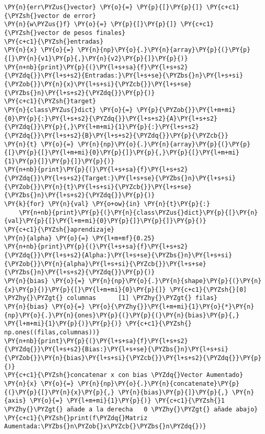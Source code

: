 \begin{tcolorbox}[breakable, size=fbox, boxrule=1pt, pad at break*=1mm,colback=cellbackground, colframe=cellborder]
\begin{Verbatim}[commandchars=\\\{\}]
\PY{n}{err\PYZus{}vector} \PY{o}{=} \PY{p}{[}\PY{p}{]} \PY{c+c1}{\PYZsh{}vector de error}
\PY{n}{w\PYZus{}f} \PY{o}{=} \PY{p}{[}\PY{p}{]} \PY{c+c1}{\PYZsh{}vector de pesos finales}
\PY{c+c1}{\PYZsh{}entradas}
\PY{n}{x} \PY{o}{=} \PY{n}{np}\PY{o}{.}\PY{n}{array}\PY{p}{(}\PY{p}{[}\PY{n}{v1}\PY{p}{,}\PY{n}{v2}\PY{p}{]}\PY{p}{)}
\PY{n+nb}{print}\PY{p}{(}\PY{l+s+sa}{f}\PY{l+s+s2}{\PYZdq{}}\PY{l+s+s2}{Entradas:}\PY{l+s+se}{\PYZbs{}n}\PY{l+s+si}{\PYZob{}}\PY{n}{x}\PY{l+s+si}{\PYZcb{}}\PY{l+s+se}{\PYZbs{}n}\PY{l+s+s2}{\PYZdq{}}\PY{p}{)}
\PY{c+c1}{\PYZsh{}target}
\PY{n}{class\PYZus{}dict} \PY{o}{=} \PY{p}{\PYZob{}}\PY{l+m+mi}{0}\PY{p}{:}\PY{l+s+s2}{\PYZdq{}}\PY{l+s+s2}{A}\PY{l+s+s2}{\PYZdq{}}\PY{p}{,}\PY{l+m+mi}{1}\PY{p}{:}\PY{l+s+s2}{\PYZdq{}}\PY{l+s+s2}{B}\PY{l+s+s2}{\PYZdq{}}\PY{p}{\PYZcb{}}
\PY{n}{t} \PY{o}{=} \PY{n}{np}\PY{o}{.}\PY{n}{array}\PY{p}{(}\PY{p}{[}\PY{p}{[}\PY{l+m+mi}{0}\PY{p}{]}\PY{p}{,}\PY{p}{[}\PY{l+m+mi}{1}\PY{p}{]}\PY{p}{]}\PY{p}{)}
\PY{n+nb}{print}\PY{p}{(}\PY{l+s+sa}{f}\PY{l+s+s2}{\PYZdq{}}\PY{l+s+s2}{Target:}\PY{l+s+se}{\PYZbs{}n}\PY{l+s+si}{\PYZob{}}\PY{n}{t}\PY{l+s+si}{\PYZcb{}}\PY{l+s+se}{\PYZbs{}n}\PY{l+s+s2}{\PYZdq{}}\PY{p}{)}
\PY{k}{for} \PY{n}{val} \PY{o+ow}{in} \PY{n}{t}\PY{p}{:}
    \PY{n+nb}{print}\PY{p}{(}\PY{n}{class\PYZus{}dict}\PY{p}{[}\PY{n}{val}\PY{p}{[}\PY{l+m+mi}{0}\PY{p}{]}\PY{p}{]}\PY{p}{)}
\PY{c+c1}{\PYZsh{}aprendizaje}
\PY{n}{alpha} \PY{o}{=} \PY{l+m+mf}{0.25}
\PY{n+nb}{print}\PY{p}{(}\PY{l+s+sa}{f}\PY{l+s+s2}{\PYZdq{}}\PY{l+s+s2}{Alpha:}\PY{l+s+se}{\PYZbs{}n}\PY{l+s+si}{\PYZob{}}\PY{n}{alpha}\PY{l+s+si}{\PYZcb{}}\PY{l+s+se}{\PYZbs{}n}\PY{l+s+s2}{\PYZdq{}}\PY{p}{)}
\PY{n}{bias} \PY{o}{=} \PY{n}{np}\PY{o}{.}\PY{n}{shape}\PY{p}{(}\PY{n}{x}\PY{p}{)}\PY{p}{[}\PY{l+m+mi}{0}\PY{p}{]} \PY{c+c1}{\PYZsh{}[0] \PYZhy{}\PYZgt{} columnas      [1] \PYZhy{}\PYZgt{} filas}
\PY{n}{bias} \PY{o}{=} \PY{o}{\PYZhy{}}\PY{l+m+mi}{1}\PY{o}{*}\PY{n}{np}\PY{o}{.}\PY{n}{ones}\PY{p}{(}\PY{p}{(}\PY{n}{bias}\PY{p}{,} \PY{l+m+mi}{1}\PY{p}{)}\PY{p}{)} \PY{c+c1}{\PYZsh{} np.ones((filas,columnas))}
\PY{n+nb}{print}\PY{p}{(}\PY{l+s+sa}{f}\PY{l+s+s2}{\PYZdq{}}\PY{l+s+s2}{Bias:}\PY{l+s+se}{\PYZbs{}n}\PY{l+s+si}{\PYZob{}}\PY{n}{bias}\PY{l+s+si}{\PYZcb{}}\PY{l+s+s2}{\PYZdq{}}\PY{p}{)}
\PY{c+c1}{\PYZsh{}concatenar x con bias \PYZdq{}Vector Aumentado}
\PY{n}{x} \PY{o}{=} \PY{n}{np}\PY{o}{.}\PY{n}{concatenate}\PY{p}{(}\PY{p}{[}\PY{n}{x}\PY{p}{,} \PY{n}{bias}\PY{p}{]}\PY{p}{,} \PY{n}{axis} \PY{o}{=} \PY{l+m+mi}{1}\PY{p}{)} \PY{c+c1}{\PYZsh{}1 \PYZhy{}\PYZgt{} añade a la derecha   0 \PYZhy{}\PYZgt{} añade abajo}
\PY{c+c1}{\PYZsh{}print(f\PYZdq{}Matriz Aumentada:\PYZbs{}n\PYZob{}x\PYZcb{}\PYZbs{}n\PYZdq{})}

\end{Verbatim}
\end{tcolorbox}
